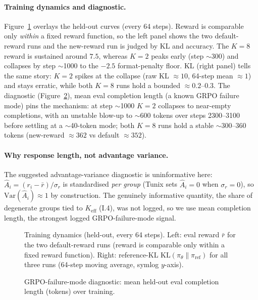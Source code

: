 \paragraph{Training dynamics and diagnostic.}
Figure~\ref{fig:dynamics} overlays the held-out curves (every 64 steps). Reward is comparable only
\emph{within} a fixed reward function, so the left panel shows the two default-reward runs and the
new-reward run is judged by KL and accuracy. The $K=8$ reward is sustained around $7.5$, whereas
$K=2$ peaks early (step $\sim$300) and collapses by step $\sim$1000 to the $-2.5$ format-penalty
floor. KL (right panel) tells the same story: $K=2$ spikes at the collapse (raw KL $\approx10$, 64-step
mean $\approx1$) and stays erratic, while both $K=8$ runs hold a bounded $\approx0.2$--$0.3$. The diagnostic
(Figure~\ref{fig:length-diagnostic}), mean eval completion length (a known GRPO failure mode)
pins the mechanism: at step $\sim$1000 $K=2$ collapses to near-empty completions, with an unstable
blow-up to $\sim$600 tokens over steps 2300--3100 before settling at a $\sim$40-token mode; both
$K=8$ runs hold a stable $\sim$300--360 tokens (new-reward $\approx362$ vs default $\approx352$).

\paragraph{Why response length, not advantage variance.}
The suggested advantage-variance diagnostic is uninformative here: $\hat A_i=(r_i-\bar r)/\sigma_r$ is
standardised \emph{per group} (Tunix sets $\hat A_i=0$ when $\sigma_r=0$), so $\mathrm{Var}(\hat A_i)\approx1$
by construction. The genuinely informative quantity, the share of degenerate groups tied to
$K_{\mathrm{eff}}$ (I.4), was not logged, so we use mean completion length, the strongest logged
GRPO-failure-mode signal.

\begin{figure}[htbp]
\centering
{}
\caption{Training dynamics (held-out, every 64 steps). Left: eval reward $\bar r$ for the two
default-reward runs (reward is comparable only within a fixed reward function). Right: reference-KL
$\mathrm{KL}(\pi_\theta\|\pi_{\mathrm{ref}})$ for all three runs (64-step moving average, symlog
$y$-axis).}
\label{fig:dynamics}
\end{figure}

\begin{figure}[htbp]
\centering
{}
\caption{GRPO-failure-mode diagnostic: mean held-out eval completion length (tokens) over training.}
\label{fig:length-diagnostic}
\end{figure}


